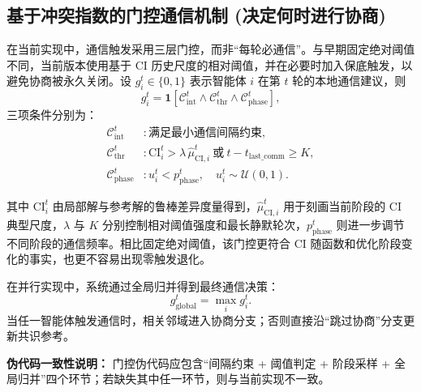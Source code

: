 \documentclass[12pt]{ctexart}
\begin{document}
\subsection{基于冲突指数的门控通信机制
(决定何时进行协商)}\label{ux57faux4e8eux51b2ux7a81ux6307ux6570ux7684ux95e8ux63a7ux901aux4fe1ux673aux5236-ux51b3ux5b9aux4f55ux65f6ux8fdbux884cux534fux5546}

在当前实现中，通信触发采用三层门控，而非“每轮必通信”。与早期固定绝对阈值不同，当前版本使用基于 CI 历史尺度的相对阈值，并在必要时加入保底触发，以避免协商被永久关闭。设 \(g_i^t\in\{0,1\}\) 表示智能体 \(i\) 在第 \(t\) 轮的本地通信建议，则
\[
g_i^t=\mathbf{1}\!\left[\mathcal{C}_{\mathrm{int}}^t\land \mathcal{C}_{\mathrm{thr}}^t\land \mathcal{C}_{\mathrm{phase}}^t\right],
\]
三项条件分别为：
\begin{align}
\mathcal{C}_{\mathrm{int}}^t &: \text{满足最小通信间隔约束},\\
\mathcal{C}_{\mathrm{thr}}^t &: \mathrm{CI}_i^t > \lambda\,\hat{\mu}_{\mathrm{CI},i}^t\ \text{或}\ t-t_{\mathrm{last\_comm}}\ge K,\\
\mathcal{C}_{\mathrm{phase}}^t &: u_i^t < p_{\mathrm{phase}}^t,\quad u_i^t\sim\mathcal{U}(0,1).
\end{align}

其中 \(\mathrm{CI}_i^t\) 由局部解与参考解的鲁棒差异度量得到，\(\hat{\mu}_{\mathrm{CI},i}^t\) 用于刻画当前阶段的 CI 典型尺度，\(\lambda\) 与 \(K\) 分别控制相对阈值强度和最长静默轮次，\(p_{\mathrm{phase}}^t\) 则进一步调节不同阶段的通信频率。相比固定绝对阈值，该门控更符合 CI 随函数和优化阶段变化的事实，也更不容易出现零触发退化。

在并行实现中，系统通过全局归并得到最终通信决策：
\[
g_{\mathrm{global}}^t=\max_i g_i^t.
\]
当任一智能体触发通信时，相关邻域进入协商分支；否则直接沿“跳过协商”分支更新共识参考。

\textbf{伪代码一致性说明：} 门控伪代码应包含“间隔约束 + 阈值判定 + 阶段采样 + 全局归并”四个环节；若缺失其中任一环节，则与当前实现不一致。
\end{document}
